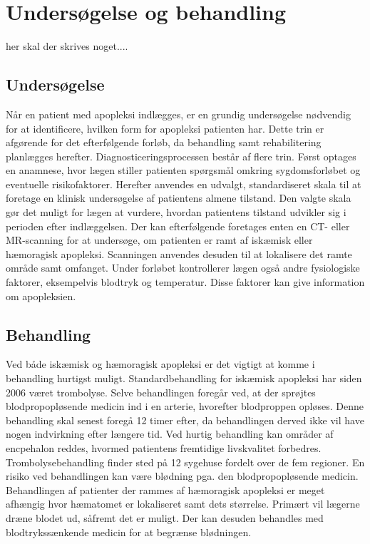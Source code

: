 \section{Undersøgelse og behandling}
her skal der skrives noget....

\subsection{Undersøgelse}
Når en patient med apopleksi indlægges, er en grundig undersøgelse nødvendig for at identificere, hvilken form for apopleksi patienten har. Dette trin er afgørende for det efterfølgende forløb, da behandling samt rehabilitering planlægges herefter.
Diagnosticeringsprocessen består af flere trin. Først optages en anamnese, hvor lægen stiller patienten spørgsmål omkring sygdomsforløbet og eventuelle risikofaktorer. Herefter anvendes en udvalgt, standardiseret skala til at foretage en klinisk undersøgelse af patientens almene tilstand. Den valgte skala gør det muligt for lægen at vurdere, hvordan patientens tilstand udvikler sig i perioden efter indlæggelsen.
Der kan efterfølgende foretages enten en CT- eller MR-scanning for at undersøge, om patienten er ramt af iskæmisk eller hæmoragisk apopleksi. Scanningen anvendes desuden til at lokalisere det ramte område samt omfanget. Under forløbet kontrollerer lægen også andre fysiologiske faktorer, eksempelvis blodtryk og temperatur. Disse faktorer kan give information om apopleksien.\cite{Sundhedsstyrelsen2009} 

\subsection{Behandling}
Ved både iskæmisk og hæmoragisk apopleksi er det vigtigt at komme i behandling hurtigst muligt. \cite{Soenderborg2013}  
Standardbehandling for iskæmisk apopleksi har siden 2006 været trombolyse. Selve behandlingen foregår ved, at der sprøjtes blodpropopløsende medicin ind i en arterie, hvorefter blodproppen opløses. Denne behandling skal senest foregå 12 timer efter, da behandlingen derved ikke vil have nogen indvirkning efter længere tid. Ved hurtig behandling kan områder af encpehalon reddes, hvormed patientens fremtidige livskvalitet forbedres. Trombolysebehandling finder sted på 12 sygehuse fordelt over de fem regioner. En risiko ved behandlingen kan være blødning pga. den blodpropopløsende medicin. \cite{Hjernesagen2015b}
Behandlingen af patienter der rammes af hæmoragisk apopleksi er meget afhængig hvor hæmatomet er lokaliseret samt dets størrelse. Primært vil lægerne dræne blodet ud, såfremt det er muligt. Der kan desuden behandles med blodtrykssænkende medicin for at begrænse blødningen. \cite{Caplan2006} 

